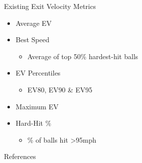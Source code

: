 \documentclass{beamer}
\begin{document}
\begin{frame}{Existing Exit Velocity Metrics}
\begin{itemize}
    \item Average EV
    \item Best Speed
    \begin{itemize}
        \item Average of top 50\% hardest-hit balls
    \end{itemize}
    \item EV Percentiles
    \begin{itemize}
        \item EV80, EV90 \& EV95
    \end{itemize}
    \item Maximum EV
    \item Hard-Hit \%
    \begin{itemize}
        \item \% of balls hit >95mph
    \end{itemize}
\end{itemize}
\end{frame}

\begin{frame}{References}
    \printbibliography
\end{frame}
\end{document}
